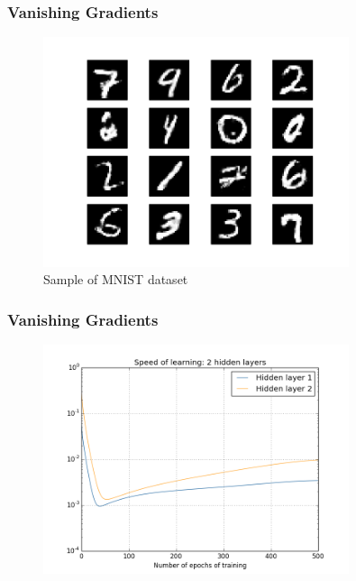 \documentclass{beamer}
\begin{document}
\begin{frame}
	\frametitle{Vanishing Gradients}
	
	\begin{figure}
		\includegraphics[width=0.8\textwidth]{imgs/mnist}
		\caption{Sample of MNIST dataset}
	\end{figure}
\end{frame}


\begin{frame}
	\frametitle{Vanishing Gradients}
	
	\begin{figure}
		\includegraphics[width=0.8\textwidth]{imgs/training_speed_2_layers}
	\end{figure}
\end{frame}
\end{document}
